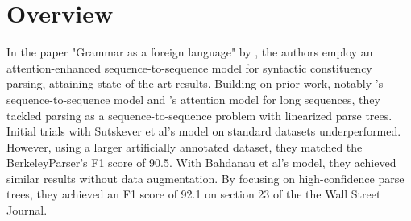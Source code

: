 \documentclass[
10pt, %
a4paper, %
oneside, %
headinclude,footinclude, %
BCOR5mm, %
]{scrartcl}
\title{\normalfont\spacedallcaps{Comp 550: Fall 2023\\Reading Assignment 2}} %
\author{\spacedlowsmallcaps{Caleb Moses*}} %
\date{} %
\begin{document}

\renewcommand{\sectionmark}[1]{\markright{\spacedlowsmallcaps{#1}}} %
\lehead{\mbox{\llap{\small\thepage\kern1em\color{halfgray} \vline}\color{halfgray}\hspace{0.5em}\rightmark\hfil}} %

\pagestyle{scrheadings} %


\maketitle %

\setcounter{tocdepth}{2} %


\let\thefootnote\relax{}



\section{Overview}

In the paper "Grammar as a foreign language" by \citet{vinyals2015grammar}, the authors employ an attention-enhanced sequence-to-sequence model for syntactic constituency parsing, attaining state-of-the-art results. Building on prior work, notably \citet{sutskever2014sequence}'s sequence-to-sequence model and \citet{bahdanau2014neural}'s attention model for long sequences, they tackled parsing as a sequence-to-sequence problem with linearized parse trees. Initial trials with Sutskever et al's model on standard datasets underperformed. However, using a larger artificially annotated dataset, they matched the BerkeleyParser's F1 score of 90.5. With Bahdanau et al's model, they achieved similar results without data augmentation. By focusing on high-confidence parse trees, they achieved an F1 score of 92.1 on section 23 of the the Wall Street Journal.
\end{document}
